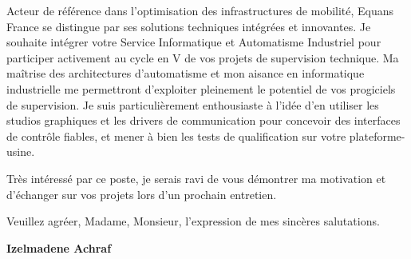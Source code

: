 \documentclass[10pt,a4paper]{altacv}
\begin{document}
\vspace{0.4cm}

Acteur de référence dans l'optimisation des infrastructures de mobilité, Equans France se distingue par ses solutions techniques intégrées et innovantes. Je souhaite intégrer votre Service Informatique et Automatisme Industriel pour participer activement au cycle en V de vos projets de supervision technique. Ma maîtrise des architectures d'automatisme et mon aisance en informatique industrielle me permettront d'exploiter pleinement le potentiel de vos progiciels de supervision. Je suis particulièrement enthousiaste à l'idée d'en utiliser les studios graphiques et les drivers de communication pour concevoir des interfaces de contrôle fiables, et mener à bien les tests de qualification sur votre plateforme-usine.

\vspace{0.4cm}

Très intéressé par ce poste, je serais ravi de vous démontrer ma motivation et d'échanger sur vos projets lors d'un prochain entretien.

\vspace{0.5cm}

Veuillez agréer, Madame, Monsieur, l'expression de mes sincères salutations.

\vfill

\begin{flushright}
  \Large\color{emphasis}\textbf{Izelmadene Achraf}
\end{flushright}
\end{document}
